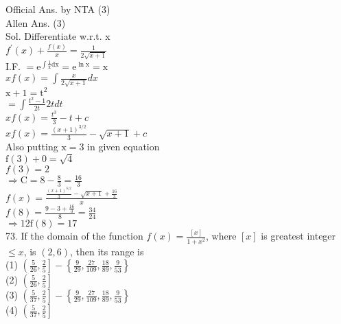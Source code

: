 \documentclass[10pt]{article}
\begin{document}
Official Ans. by NTA (3)\\
Allen Ans. (3)\\
Sol. Differentiate w.r.t. x\\
\(f^{\prime}(x)+\frac{f(x)}{x}=\frac{1}{2 \sqrt{x+1}}\)\\
I.F. \(=\mathrm{e}^{\int \frac{1}{\mathrm{x}} \mathrm{d} \mathrm{x}}=\mathrm{e}^{\ln \mathrm{x}}=\mathrm{x}\)\\
\(x f(x)=\int \frac{x}{2 \sqrt{x+1}} d x\)\\
\(\mathrm{x}+1=\mathrm{t}^{2}\)\\
\(=\int \frac{t^{2}-1}{2 t} 2 t d t\)\\
\(x f(x)=\frac{t^{3}}{3}-t+c\)\\
\(x f(x)=\frac{(x+1)^{3 / 2}}{3}-\sqrt{x+1}+c\)\\
Also putting \(\mathrm{x}=3\) in given equation\\
\(\mathrm{f}(3)+0=\sqrt{4}\)\\
\(f(3)=2\)\\
\(\Rightarrow \mathrm{C}=8-\frac{8}{3}=\frac{16}{3}\)\\
\(f(x)=\frac{\frac{(x+1)^{3 / 2}}{3}-\sqrt{x+1}+\frac{16}{3}}{x}\)\\
\(f(8)=\frac{9-3+\frac{16}{3}}{8}=\frac{34}{24}\)\\
\(\Rightarrow 12 \mathrm{f}(8)=17\)\\
73. If the domain of the function \(f(x)=\frac{[x]}{1+x^{2}}\), where \([x]\) is greatest integer \(\leq x\), is \((2,6)\), then its range is\\
(1) \(\left(\frac{5}{26}, \frac{2}{5}\right]-\left\{\frac{9}{29}, \frac{27}{109}, \frac{18}{89}, \frac{9}{53}\right\}\)\\
(2) \(\left(\frac{5}{26}, \frac{2}{5}\right]\)\\
(3) \(\left(\frac{5}{37}, \frac{2}{5}\right]-\left\{\frac{9}{29}, \frac{27}{109}, \frac{18}{89}, \frac{9}{53}\right\}\)\\
(4) \(\left(\frac{5}{37}, \frac{2}{5}\right]\)
\end{document}
